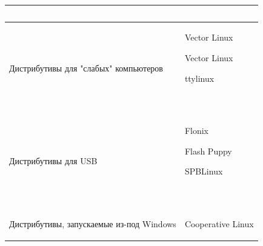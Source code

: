 \documentclass[bachelor, och, referat, times]{SCWorks}
\begin{document}
\begin{longtable}{|p{}|p{}|}
\begin{minipage}{\textwidth}
        ~
    \end{minipage}
    \\\hline
    Дистрибутивы для "слабых" компьютеров &
    \begin{minipage}{\textwidth}
        \begin{list}{•}{~}
            \item Vector Linux
            \item Vector Linux
            \item ttylinux
        \end{list}
        ~
    \end{minipage}
    \\\hline
    Дистрибутивы для USB &
    \begin{minipage}{\textwidth}
        \begin{list}{•}{~}
            \item Flonix
            \item Flash Puppy
            \item SPBLinux
        \end{list}
        ~
    \end{minipage}
    \\\hline
    Дистрибутивы, запускаемые из-под Windows &
    \begin{minipage}{\textwidth}
        \begin{list}{•}{~}
            \item Cooperative Linux
        \end{list}
        
    \end{minipage}
    \hline
\end{longtable}
\end{document}
